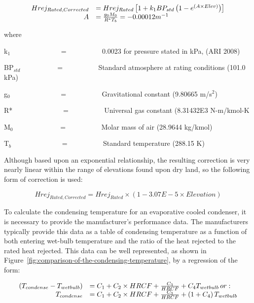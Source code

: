 \begin{equation}
  \begin{array}{rl}
    Hrej_{Rated,Corrected} &= Hrej_{Rated} \left[ 1 + k_1 B P_{std} \left(1 - e^{\left(A \times Elev\right)}\right)\right] \\
    A &= \frac{g_0 M_0}{R^* T_b} = - 0.00012m^{-1}
  \end{array}
\end{equation}

where

k\(_{1}\)~~~~~~~~~~~~~~ = ~~~~~~~~~ 0.0023 for pressure stated in kPa, (ARI 2008)

BP\(_{std}\)~~~~~~~~~~ = ~~~~~~~~~ Standard atmosphere at rating conditions (101.0 kPa)

g\(_{0}\)~~~~~~~~~~~~~~ = ~~~~~~~~~ Gravitational constant (9.80665 m/s\(^{2}\))

R*~~~~~~~~~~~~~~ = ~~~~~~~~~ Universal gas constant (8.31432E3 N-m/kmol-K

M\(_{0}\)~~~~~~~~~~~~~ = ~~~~~~~~~ Molar mass of air (28.9644 kg/kmol)

T\(_{b}\)~~~~~~~~~~~~~~ = ~~~~~~~~~ Standard temperature (288.15 K)

Although based upon an exponential relationship, the resulting correction is very nearly linear within the range of elevations found upon dry land, so the following form of correction is used:

\begin{equation}
Hre{j_{Rated,Corrected}} = Hre{j_{Rated}} \times (1 - 3.07E - 5 \times Elevation)
\end{equation}

To calculate the condensing temperature for an evaporative cooled condenser, it is necessary to provide the manufacturer's performance data. The manufacturers typically provide this data as a table of condensing temperature as a function of both entering wet-bulb temperature and the ratio of the heat rejected to the rated heat rejected. This data can be well represented, as shown in Figure~\ref{fig:comparison-of-the-condensing-temperature}, by a regression of the form:

\begin{equation}
  \begin{array}{rl}
    \left(T_{condense} - T_{wetbulb}\right) &= {C_1} + {C_2} \times HRCF + \frac{C_3}{HRCF} + {C_4}{T_{wetbulb}}\, or: \\
    T_{condense} &= {C_1} + {C_2} \times HRCF + \frac{C_3}{HRCF} + \left(1 + C_4\right)T_{wetbulb}
  \end{array}
\end{equation}

